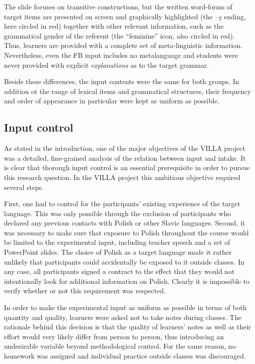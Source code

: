 The slide focuses on transitive constructions, but the written word-forms of target items are presented on screen and graphically highlighted (the \textit{–ę} ending, here circled in red) together with other relevant information, such as the grammatical gender of the referent (the “feminine” icon, also  circled in red). Thus, learners are provided with a complete set of meta-linguistic information. Nevertheless, even the FB input includes no metalanguage and students were never provided with explicit \textit{explanations} as to the target grammar. 

Beside these differences, the input contents were the same for both groups. In addition ot the range of lexical items and grammatical structures, their frequency and order of appearance in particular were kept as uniform as possible. 

\subsection{Input control}\label{sec:02:1.1}

As stated in the introduction, one of the major objectives of the VILLA project was a detailed, fine-grained analysis of the relation between input and intake. It is clear that thorough input control is an essential prerequisite in order to pursue this research question. In the VILLA project this ambitious objective required several steps.

First, one had to control for the participants’ existing experience of the target language. This was  only possible through the exclusion of participants who declared any previous contacts with Polish or other Slavic languages. Second, it was necessary to make sure that exposure to Polish throughout the course would be limited to the experimental input, including teacher speech and a set of PowerPoint slides. The choice of Polish as a target language made it rather unlikely that participants could accidentally be exposed to it outside classes. In any case, all participants signed a contract to the effect that they would not intentionally look for additional information on Polish. Clearly it is impossible to verify whether or not this requirement was respected.

In order to make the experimental input as uniform as possible in terms of both quantity and quality, learners were asked not to take notes during classes. The rationale behind this decision is that the quality of learners’ notes as well as their effort would very likely differ from person to person, thus introducing an undesirable variable beyond methodological control. For the same reason, no homework was assigned and individual practice outside classes was discouraged.

